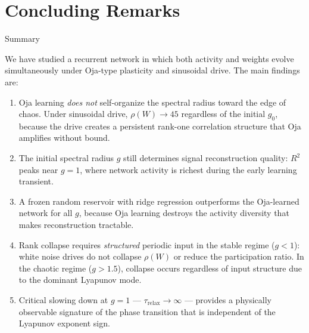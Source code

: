 \documentclass[
11pt,notheorems,hyperref={pdfauthor=whatever}
]{beamer}
\begin{document}
\section{Concluding Remarks}

\begin{frame}{Summary}
\small

We have studied a recurrent network in which both activity and weights evolve
simultaneously under Oja-type plasticity and sinusoidal drive. The main findings are:

\vspace{0.3em}

\begin{enumerate}
\item Oja learning \emph{does not} self-organize the spectral radius toward
      the edge of chaos. Under sinusoidal drive, $\rho(W) \to 45$ regardless
      of the initial $g_0$, because the drive creates a persistent rank-one
      correlation structure that Oja amplifies without bound.

\item The initial spectral radius $g$ still determines signal reconstruction
      quality: $R^2$ peaks near $g=1$, where network activity is richest during
      the early learning transient.

\item A frozen random reservoir with ridge regression outperforms
      the Oja-learned network for all $g$, because Oja learning destroys
      the activity diversity that makes reconstruction tractable.

\item Rank collapse requires \emph{structured} periodic input in the stable regime
      ($g < 1$): white noise drives do not collapse $\rho(W)$ or reduce the
      participation ratio. In the chaotic regime ($g > 1.5$), collapse occurs
      regardless of input structure due to the dominant Lyapunov mode.

\item Critical slowing down at $g=1$ — $\tau_{\mathrm{relax}} \to \infty$ —
      provides a physically observable signature of the phase transition that
      is independent of the Lyapunov exponent sign.
\end{enumerate}

\end{frame}
\end{document}
